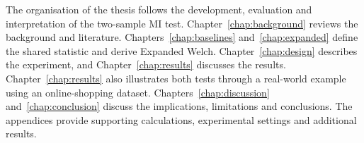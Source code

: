 The organisation of the thesis follows the development, evaluation and
interpretation of the two-sample MI test.
Chapter~\ref{chap:background} reviews the background and literature.
Chapters~\ref{chap:baselines} and~\ref{chap:expanded} define the shared
statistic and derive Expanded Welch. Chapter~\ref{chap:design} describes
the experiment, and Chapter~\ref{chap:results} discusses the results.
Chapter~\ref{chap:results} also illustrates both tests through a real-world
example using an online-shopping dataset. Chapters~\ref{chap:discussion}
and~\ref{chap:conclusion} discuss the implications, limitations and
conclusions. The appendices provide supporting calculations, experimental
settings and additional results.
